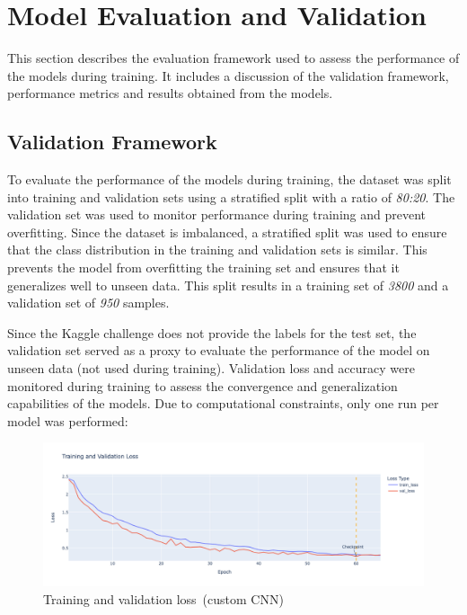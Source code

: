 \section{Model Evaluation and Validation}

This section describes the evaluation framework used to assess the performance of the models during training. It includes a discussion of the validation framework, performance metrics and results obtained from the models.

\subsection{Validation Framework}

To evaluate the performance of the models during training, the dataset was split into training and validation sets using a stratified split with a ratio of \textit{80:20}. The validation set was used to monitor performance during training and prevent overfitting. Since the dataset is imbalanced, a stratified split was used to ensure that the class distribution in the training and validation sets is similar. This prevents the model from overfitting the training set and ensures that it generalizes well to unseen data. This split results in a training set of \textit{3800} and a validation set of \textit{950} samples.

Since the Kaggle challenge does not provide the labels for the test set, the validation set served as a proxy to evaluate the performance of the model on unseen data (not used during training). Validation loss and accuracy were monitored during training to assess the convergence and generalization capabilities of the models. Due to computational constraints, only one run per model was performed:

\begin{figure}[htbp]
    \centerline{\includegraphics[width=0.9\linewidth]{../../resources/custom_cnn/loss.png}}
    \caption{Training and validation loss~(custom CNN)}
    \label{fig:loss-custom-cnn}
\end{figure}

